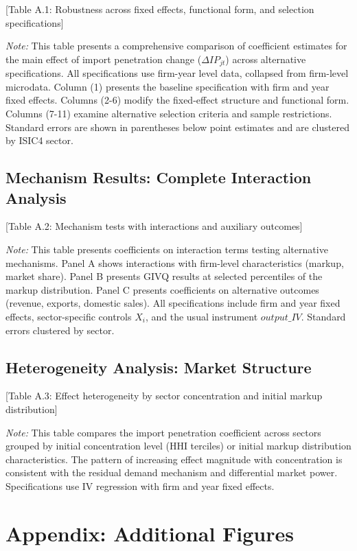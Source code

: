 \documentclass[12pt]{article}
\begin{document}
[Table A.1: Robustness across fixed effects, functional form, and selection specifications]

\textit{Note:} This table presents a comprehensive comparison of coefficient estimates for the main effect of import penetration change ($\Delta IP_{jt}$) across alternative specifications. All specifications use firm-year level data, collapsed from firm-level microdata. Column (1) presents the baseline specification with firm and year fixed effects. Columns (2-6) modify the fixed-effect structure and functional form. Columns (7-11) examine alternative selection criteria and sample restrictions. Standard errors are shown in parentheses below point estimates and are clustered by ISIC4 sector.

\subsection{Mechanism Results: Complete Interaction Analysis}

[Table A.2: Mechanism tests with interactions and auxiliary outcomes]

\textit{Note:} This table presents coefficients on interaction terms testing alternative mechanisms. Panel A shows interactions with firm-level characteristics (markup, market share). Panel B presents GIVQ results at selected percentiles of the markup distribution. Panel C presents coefficients on alternative outcomes (revenue, exports, domestic sales). All specifications include firm and year fixed effects, sector-specific controls $X_i$, and the usual instrument $output\_IV$. Standard errors clustered by sector.

\subsection{Heterogeneity Analysis: Market Structure}

[Table A.3: Effect heterogeneity by sector concentration and initial markup distribution]

\textit{Note:} This table compares the import penetration coefficient across sectors grouped by initial concentration level (HHI terciles) or initial markup distribution characteristics. The pattern of increasing effect magnitude with concentration is consistent with the residual demand mechanism and differential market power. Specifications use IV regression with firm and year fixed effects.

\section{Appendix: Additional Figures}
\end{document}
